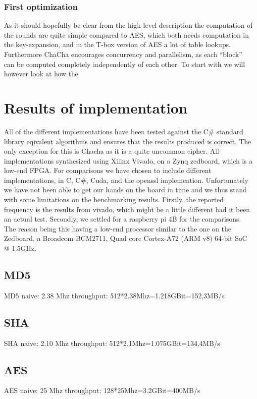 \documentclass[a4paper]{article}
\begin{document}
\subsubsection{First optimization}
\label{ChaCha1}
As it should hopefully be clear from the high level description the computation of the rounds are quite simple compared to AES, which both needs computation in the key-expansion, and in the T-box version of AES a lot of table lookups. Furthermore ChaCha encourages concurrency and parallelism, as each ``block'' can be computed completely independently of each other. To start with we will however look at how the

\section{Results of implementation}
\label{sec:org281b80b}
All of the different implementations have been tested against the C\# standard library eqivalent algorithms and ensures that the results produced is correct. The only exception for this is Chacha as it is a quite uncommon cipher. All implementations synthesized using Xilinx Vivado, on a Zynq zedboard, which is a low-end FPGA. For comparisons we have chosen to include different implementations, in C, C\#, Cuda, and the openssl implemention. Unfortunately we have not been able to get our hands on the board in time and we thus stand with some limitations on the benchmarking results. Firstly, the reported frequency is the results from vivado, which might be a little different had it been an actual test.  Secondly, we settled for a raspberry pi 4B for the comparisons. The reason being this having a low-end processor similar to the one on the Zedboard, a Broadcom BCM2711, Quad core Cortex-A72 (ARM v8) 64-bit SoC @ 1.5GHz.
\subsection{MD5}
\label{sec:org0245a01}
MD5 naive: 2.38 Mhz
throughput: 512*2.38Mhz=1.218GBit=152,3MB/s
\subsection{SHA}
\label{sec:orgd1d4804}
SHA naive: 2.10 Mhz
throughput: 512*2.1Mhz=1.075GBit=134,4MB/s

\subsection{AES}
\label{sec:org9a84ce9}
AES naive: 25 Mhz
throughput: 128*25Mhz=3.2GBit=400MB/s
\end{document}
